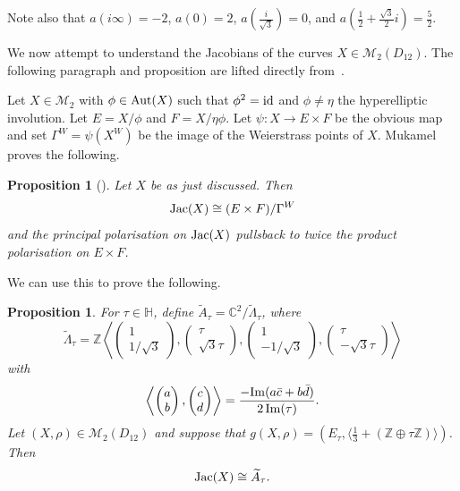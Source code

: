 \documentclass[a4paper,11pt]{amsart}
\numberwithin{equation}{section}
\numberwithin{figure}{section}
\numberwithin{table}{section}
\newtheorem{proposition}[theorem]{Proposition}
\newcommand{\C}{\mathbb{C}}
\newcommand{\Z}{\mathbb{Z}}
\DeclareMathOperator{\Aut}{{\rm{Aut}}}
\DeclareMathOperator{\Jac}{{\rm{Jac}}}
\begin{document}
Note also that $a(i\infty) = -2$, $a(0) = 2$, $a(\frac{i}{\sqrt{3}}) = 0$, and $a(\frac{1}{2}+\frac{\sqrt{3}}{2}i) = \frac{5}{2}$.

We now attempt to understand the Jacobians of the curves $X\in\mathcal{M}_{2}(D_{12})$. The following paragraph and proposition are lifted directly from~\cite[\S 2]{Muk}.

Let $X\in\mathcal{M}_{2}$ with $\phi\in\Aut(X)$ such that $\phi^{2} = {\rm id}$ and $\phi\neq \eta$ the hyperelliptic involution. Let $E = X/\phi$ and $F = X/\eta\phi$. Let $\psi:X\to E\times F$ be the obvious map and set $\Gamma^{W} = \psi(X^{W})$ be the image of the Weierstrass points of $X$. Mukamel proves the following.

\begin{proposition}[{\cite[Proposition 2.12]{Muk}}]
    Let $X$ be as just discussed. Then
    \[\Jac(X)\cong (E\times F)/\Gamma^{W}\]
    and the principal polarisation on $\Jac(X)$ pullsback to twice the product polarisation on $E\times F$.
\end{proposition}

We can use this to prove the following.

\begin{proposition}
    For $\tau\in\mathbb{H}$, define $\widetilde{A}_{\tau} = \C^2/\widetilde{\Lambda}_{\tau}$, where
        \[\widetilde{\Lambda}_{\tau} = \Z\left\langle\begin{pmatrix}
            1 \\
            1/\sqrt{3}
        \end{pmatrix},\begin{pmatrix}
            \tau \\
            \sqrt{3}\tau
        \end{pmatrix},\begin{pmatrix}
            1 \\
            -1/\sqrt{3}
        \end{pmatrix},\begin{pmatrix}
        \tau \\
            -\sqrt{3}\tau
        \end{pmatrix}\right\rangle\]
        with
        \[\left\langle\begin{pmatrix}
            a \\
            b
        \end{pmatrix},\begin{pmatrix}
            c \\
            d
        \end{pmatrix}\right\rangle = \frac{-{\rm{Im}}(a\bar{c}+b\bar{d})}{2\,{\rm{Im}}(\tau)}.\]
        Let $(X,\rho)\in\mathcal{M}_{2}(D_{12})$ and suppose that $g(X,\rho) = (E_{\tau},\langle\frac{1}{3}+(\Z\oplus\tau\Z)\rangle)$. Then
        \[\Jac(X)\cong\widetilde{A}_{\tau}.\]
\end{proposition}
\end{document}
